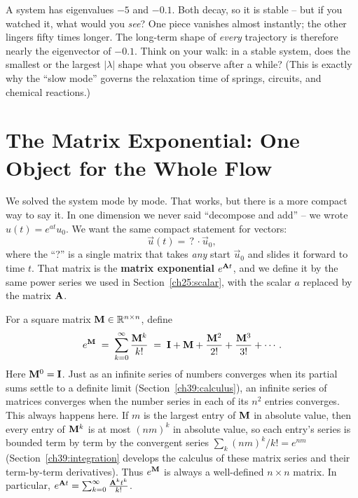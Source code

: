 \begin{walkbox}
A system has eigenvalues $-5$ and $-0.1$. Both decay, so it is stable -- but if
you watched it, what would you \emph{see}? One piece vanishes almost instantly;
the other lingers fifty times longer. The long-term shape of \emph{every}
trajectory is therefore nearly the eigenvector of $-0.1$. Think on your walk: in a
stable system, does the smallest or the largest $|\lambda|$ shape what you
observe after a while? (This is exactly why the ``slow mode'' governs the
relaxation time of springs, circuits, and chemical reactions.)
\end{walkbox}

\section{The Matrix Exponential: One Object for the Whole Flow}
\label{ch25:matexp}

We solved the system mode by mode. That works, but there is a more compact way
to say it. In one dimension we never said ``decompose and add'' -- we
wrote $u(t) = e^{at}u_0$. We want the same compact statement for vectors:
\[
  \vec{u}(t) = \,?\, \cdot \vec{u}_0,
\]
where the ``?'' is a single matrix that takes \emph{any} start $\vec{u}_0$ and
slides it forward to time $t$. That matrix is the \textbf{matrix exponential}
$e^{\mathbf{A}t}$, and we define it by the same power series we used in
Section~\ref{ch25:scalar}, with the scalar $a$ replaced by the matrix $\mathbf{A}$.

\begin{definition}
\label{ch25:def-matexp}
For a square matrix $\mathbf{M}\in\mathbb{R}^{n\times n}$, define
\[
  e^{\mathbf{M}}
  \;=\;
  \sum_{k=0}^{\infty}\frac{\mathbf{M}^k}{k!}
  \;=\;
  \mathbf{I} + \mathbf{M} + \frac{\mathbf{M}^2}{2!} + \frac{\mathbf{M}^3}{3!} + \cdots .
\]
Here $\mathbf{M}^0 = \mathbf{I}$. Just as an infinite series of numbers converges
when its partial sums settle to a definite limit (Section~\ref{ch39:calculus}),
an infinite series of matrices converges when the number series in each of its
$n^2$ entries converges. This always happens here. If $m$ is the largest entry of
$\mathbf{M}$ in absolute value, then every entry of $\mathbf{M}^k$ is at most $(nm)^k$
in absolute value, so each entry's series is bounded term by term by the
convergent series $\sum_k (nm)^k/k! = e^{nm}$
(Section~\ref{ch39:integration} develops the calculus of
these matrix series and their term-by-term derivatives). Thus $e^{\mathbf{M}}$ is
always a well-defined $n\times n$ matrix. In particular,
$e^{\mathbf{A}t} = \sum_{k=0}^{\infty}\frac{\mathbf{A}^k t^k}{k!}$.
\end{definition}

